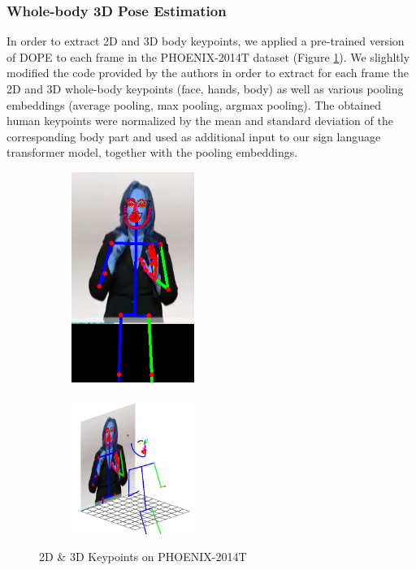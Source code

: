 \documentclass[final]{cvpr}
\begin{document}
\subsubsection{Whole-body 3D Pose Estimation}
In order to extract 2D and 3D body keypoints, we applied a pre-trained version of DOPE \cite{dope} to each frame in the PHOENIX-2014T dataset (Figure \ref{fig:2d_3d}). We slighltly modified the code provided by the authors in order to extract for each frame the 2D and 3D whole-body keypoints (face, hands, body) as well as various pooling embeddings (average pooling, max pooling, argmax pooling). The obtained human keypoints were normalized by the mean and standard deviation of the corresponding body part and used as additional input to our sign language transformer model, together with the pooling embeddings.

\begin{figure}[h]
	\begin{subfigure}[h]{0.5\linewidth}
		\centering
			\includegraphics[width=4cm]{fig/toy_DOPE_v1_0_0_2d.png}
	\end{subfigure}\hfill
	\begin{subfigure}[]{0.5\linewidth}
		\centering
		\includegraphics[width=4cm]{fig/toy_DOPE_v1_0_0_3d.png}
	\end{subfigure}
	\caption{2D \& 3D Keypoints on PHOENIX-2014T}
	\label{fig:2d_3d}
\end{figure}
\end{document}
